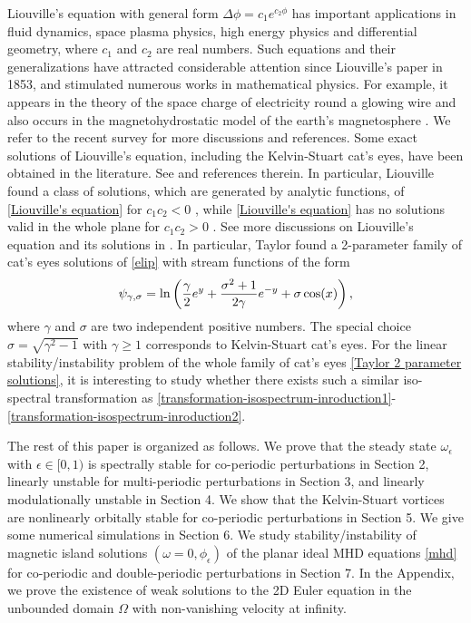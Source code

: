 \documentclass[1 [leqno, 11pt]{amsart}
\numberwithin{equation}{section}
\let\ep=\epsilon
\begin{document}
\begin{CJK*}{GBK}{song}
Liouville's equation with general form $\Delta \phi = c_1 e^{c_2\phi}$ has important applications in fluid dynamics, space plasma physics, high energy physics and differential geometry, where $c_1$ and $c_2$ are real numbers.  Such equations and their generalizations have attracted considerable   attention   since Liouville's paper \cite{Liouville1853} in 1853, and    stimulated numerous works  in mathematical physics.
For example,
 it  appears in the theory of the space charge of electricity round a glowing wire \cite{Richardson1921}  and also occurs in the magnetohydrostatic model of the
earth's magnetosphere \cite{Schindler2006}.
We refer
to the recent survey \cite{Bogatov-Kichenassamy22} for more discussions and references.
Some exact solutions of Liouville's equation, including the Kelvin-Stuart cat's eyes, have been obtained in the literature. See \cite{Crowdy97} and references therein.
In particular,
Liouville found a class of solutions, which are generated by analytic functions,  of
\eqref{Liouville's equation} for $c_1c_2<0$ \cite{Liouville1853}, while
\eqref{Liouville's equation} has no solutions valid in the whole plane for $c_1c_2>0$ \cite{Keller1957,Wittich44}.
See more discussions on Liouville's equation and its solutions in \cite{Bogatov-Kichenassamy22,Bateman32,Lutzen2012}.
\fi
In particular,  Taylor \cite{Taylor2018} found a 2-parameter family of  cat's eyes solutions of \eqref{elip} with stream functions of the form
\begin{align}\label{Taylor 2 parameter solutions}
\psi_{\gamma,\sigma}=\ln\left({\gamma\over2}e^y+{\sigma^2+1\over2\gamma}e^{-y}+\sigma\cos(x)\right),
\end{align}
where $\gamma$ and $\sigma$ are two independent positive numbers. The special choice $\sigma=\sqrt{\gamma^2-1}$ with $\gamma \geq1$ corresponds to Kelvin-Stuart cat's eyes. For the linear stability/instability problem of the whole family of cat's eyes \eqref{Taylor 2 parameter solutions}, it is interesting to study whether there exists such a similar iso-spectral transformation as \eqref{transformation-isospectrum-inroduction1}-\eqref{transformation-isospectrum-inroduction2}.

The rest of this paper is organized as follows. We
prove that the steady state $\omega_\ep$ with $\ep\in[0,1)$ is  spectrally stable
for co-periodic perturbations in Section 2,   linearly unstable for multi-periodic  perturbations in Section 3, and
linearly modulationally unstable in Section 4. We  show that the Kelvin-Stuart vortices are nonlinearly  orbitally stable for co-periodic perturbations in Section 5. We give some numerical simulations  in Section 6.  We study  stability/instability of  magnetic island solutions $(\omega=0,\phi_{\ep})$ of  the planar ideal MHD equations \eqref{mhd} for co-periodic and double-periodic perturbations in Section 7.
In the Appendix, we prove the existence of weak solutions to the 2D Euler equation in the unbounded domain $\Omega$ with non-vanishing velocity at infinity.


\end{CJK*}
\end{document}
